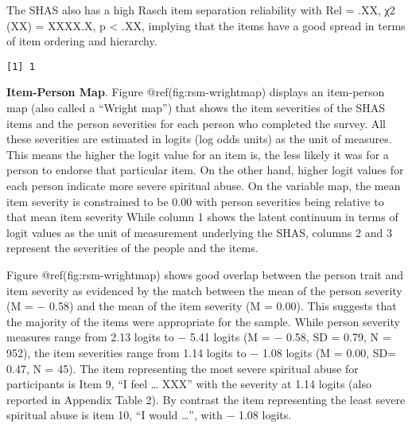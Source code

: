 \documentclass[
  letterpaper,
  DIV=11,
  numbers=noendperiod]{scrreport}
\begin{document}
The SHAS also has a high Rasch item separation reliability with Rel =
.XX, χ2 (XX) = XXXX.X, p \textless{} .XX, implying that the items have a
good spread in terms of item ordering and hierarchy.

\begin{verbatim}
[1] 1
\end{verbatim}

\textbf{Item-Person Map}. Figure @ref(fig:rsm-wrightmap) displays an
item-person map (also called a ``Wright map'') that shows the item
severities of the SHAS items and the person severities for each person
who completed the survey. All these severities are estimated in logits
(log odds units) as the unit of measures. This means the higher the
logit value for an item is, the less likely it was for a person to
endorse that particular item. On the other hand, higher logit values for
each person indicate more severe spiritual abuse. On the variable map,
the mean item severity is constrained to be 0.00 with person severities
being relative to that mean item severity While column 1 shows the
latent continuum in terms of logit values as the unit of measurement
underlying the SHAS, columns 2 and 3 represent the severities of the
people and the items.

Figure @ref(fig:rsm-wrightmap) shows good overlap between the person
trait and item severity as evidenced by the match between the mean of
the person severity (M = − 0.58) and the mean of the item severity (M =
0.00). This suggests that the majority of the items were appropriate for
the sample. While person severity measures range from 2.13 logits to −
5.41 logits (M = − 0.58, SD = 0.79, N = 952), the item severities range
from 1.14 logits to − 1.08 logits (M = 0.00, SD= 0.47, N = 45). The item
representing the most severe spiritual abuse for participants is Item 9,
``I feel \ldots{} XXX'' with the severity at 1.14 logits (also reported
in Appendix Table 2). By contrast the item representing the least severe
spiritual abuse is item 10, ``I would \ldots{}'', with − 1.08 logits.
\end{document}
